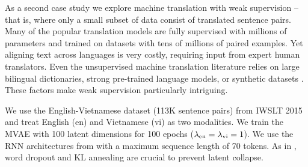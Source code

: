 As a second case study we explore machine translation with weak supervision -- that is, where only a small subset of data consist of translated sentence pairs.
Many of the popular translation models \cite{vaswani2017attention} are fully supervised with millions of parameters and trained on datasets with tens of millions of paired examples.
Yet aligning text across languages is very costly, requiring input from expert human translators.
Even the unsupervised machine translation literature relies on large bilingual dictionaries, strong pre-trained language models, or synthetic datasets \cite{lample2017unsupervised, artetxe2017unsupervised, ravi2011deciphering}. These factors make weak supervision particularly intriguing.

We use the English-Vietnamese dataset (113K sentence pairs) from IWSLT 2015 and treat English (en) and Vietnamese (vi) as two modalities.
We train the MVAE with 100 latent dimensions for 100 epochs ($\lambda_{\textup{en}} = \lambda_{\textup{vi}} = 1$). We use the RNN architectures from \cite{bowman2015generating} with a maximum sequence length of 70 tokens. As in \cite{bowman2015generating}, word dropout and KL annealing are crucial to prevent latent collapse.

